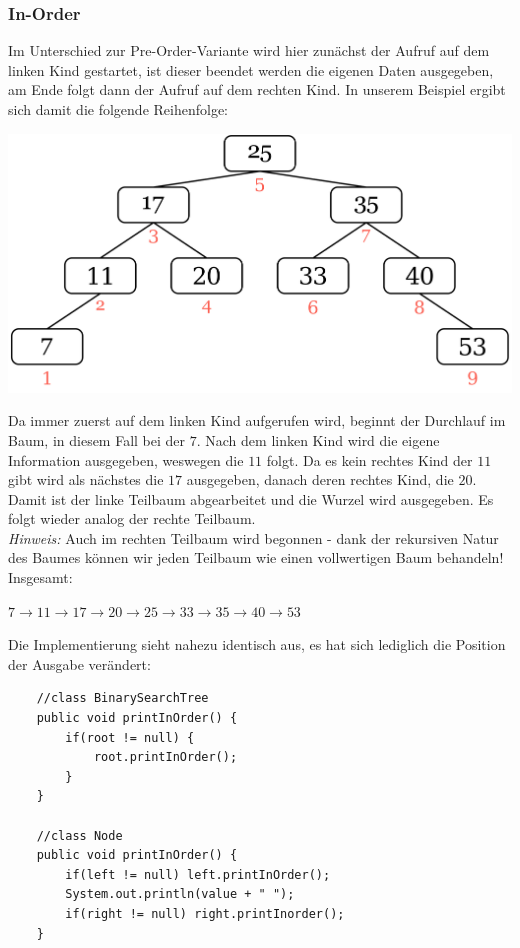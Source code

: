 \documentclass{article}
\begin{document}
\subsubsection{In-Order}
Im Unterschied zur Pre-Order-Variante wird hier zunächst der Aufruf auf dem linken Kind gestartet, ist dieser beendet werden die eigenen Daten ausgegeben, am Ende folgt dann der Aufruf auf dem rechten Kind. In unserem Beispiel ergibt sich damit die folgende Reihenfolge:
\begin{center}
    \includegraphics[scale=0.2]{../media/inorder.png}
\end{center}
Da immer zuerst auf dem linken Kind aufgerufen wird, beginnt der Durchlauf  im Baum, in diesem Fall bei der $7$. Nach dem linken Kind wird die eigene Information ausgegeben, weswegen die $11$ folgt. Da es kein rechtes Kind der $11$ gibt wird als nächstes die $17$ ausgegeben, danach deren rechtes Kind, die $20$. Damit ist der linke Teilbaum abgearbeitet und die Wurzel wird ausgegeben. Es folgt wieder analog der rechte Teilbaum. \\
\textit{Hinweis:} Auch im rechten Teilbaum wird  begonnen - dank der rekursiven Natur des Baumes können wir jeden Teilbaum wie einen vollwertigen Baum behandeln! \\
Insgesamt:
\begin{center}
    $7 \rightarrow 11 \rightarrow 17 \rightarrow 20 \rightarrow 25 \rightarrow 33 \rightarrow 35 \rightarrow 40 \rightarrow 53$
\end{center}
Die Implementierung sieht nahezu identisch aus, es hat sich lediglich die Position der Ausgabe verändert: 
\begin{verbatim}
    //class BinarySearchTree
    public void printInOrder() {
        if(root != null) {
            root.printInOrder();
        }
    }

    //class Node 
    public void printInOrder() {
        if(left != null) left.printInOrder();
        System.out.println(value + " ");
        if(right != null) right.printInorder();
    }
\end{verbatim}
\end{document}
